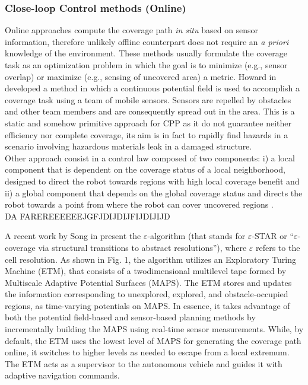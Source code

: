 \subsubsection{Close-loop Control methods (Online)} %
\label{ssub:close_loop_control_method}
Online approaches compute the coverage path \textit{in situ} based on sensor information, therefore unlikely offline counterpart does not require an \textit{a priori} knowledge of the environment. These methods usually formulate the coverage task as an optimization problem in which the goal is to minimize (e.g., sensor overlap) or maximize (e.g., sensing of uncovered area) a metric. Howard in \cite{PotFieldCPP} developed a method in which a continuous potential field is used to accomplish a coverage task using a team of mobile sensors. Sensors are repelled by obstacles and other team members and are consequently spread out in the area. This is a static and somehow primitive approach for CPP as it do not guarantee neither efficiency nor complete coverage, its aim is in fact to rapidly find hazards in a scenario involving hazardous materials leak in a damaged structure.\\
Other approach consist in a control law composed of two components: i) a local component that is dependent on the coverage status of a local neighborhood, designed to direct the robot towards regions with high local coverage benefit and ii) a global component that depends on the global coverage status and directs the robot towards a point from where the robot can cover uncovered regions \cite{6385558}.\\ DA FAREREEEEEEJGFJDIJDIJFIJDIJIJD \

A recent work by Song in \cite{8286947} present the $\varepsilon$-algorithm (that stands for $\varepsilon$-STAR or “$\varepsilon$-coverage via structural transitions to abstract resolutions”), where $\varepsilon$ refers to the cell resolution. As shown in Fig. 1, the algorithm utilizes an Exploratory Turing Machine (ETM), that consists of a twodimensional multilevel tape formed by Multiscale Adaptive Potential Surfaces (MAPS). The ETM stores and updates the information corresponding to unexplored, explored, and obstacle-occupied regions, as time-varying potentials on MAPS. In essence, it takes advantage of both the potential field-based and sensor-based planning methods by incrementally building the MAPS using real-time sensor measurements. While, by default, the ETM uses the lowest level of MAPS for generating the coverage path online, it switches to higher levels as needed to escape from a local extremum. The ETM acts as a supervisor to the autonomous vehicle and guides it with adaptive navigation commands.

